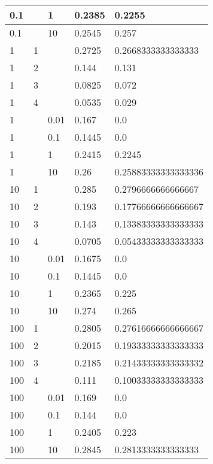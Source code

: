 \begin{table}[]
\begin{tabular}{|l|l|l|l|l|}
    0.1 & & 1 & 0.2385 & 0.2255 \\ \hline
    0.1 & & 10 & 0.2545 & 0.257 \\ \hline
    1 & 1 & & 0.2725 & 0.2668333333333333 \\ \hline
    1 & 2 & & 0.144 & 0.131 \\ \hline
    1 & 3 & & 0.0825 & 0.072 \\ \hline
    1 & 4 & & 0.0535 & 0.029 \\ \hline
    1 & & 0.01 & 0.167 & 0.0 \\ \hline
    1 & & 0.1 & 0.1445 & 0.0 \\ \hline
    1 & & 1 & 0.2415 & 0.2245 \\ \hline
    1 & & 10 & 0.26 & 0.25883333333333336 \\ \hline
    10 & 1 & & 0.285 & 0.2796666666666667 \\ \hline
    10 & 2 & & 0.193 & 0.17766666666666667 \\ \hline
    10 & 3 & & 0.143 & 0.13383333333333333 \\ \hline
    10 & 4 & & 0.0705 & 0.05433333333333333 \\ \hline
    10 & & 0.01 & 0.1675 & 0.0 \\ \hline
    10 & & 0.1 & 0.1445 & 0.0 \\ \hline
    10 & & 1 & 0.2365 & 0.225 \\ \hline
    10 & & 10 & 0.274 & 0.265 \\ \hline
    100 & 1 & & 0.2805 & 0.27616666666666667 \\ \hline
    100 & 2 & & 0.2015 & 0.19333333333333333 \\ \hline
    100 & 3 & & 0.2185 & 0.21433333333333332 \\ \hline
    100 & 4 & & 0.111 & 0.10033333333333333 \\ \hline
    100 & & 0.01 & 0.169 & 0.0 \\ \hline
    100 & & 0.1 & 0.144 & 0.0 \\ \hline
    100 & & 1 & 0.2405 & 0.223 \\ \hline
    100 & & 10 & 0.2845 & 0.2813333333333333 \\ \hline
\end{tabular}
\label{tab:kpeg}
\end{table}


